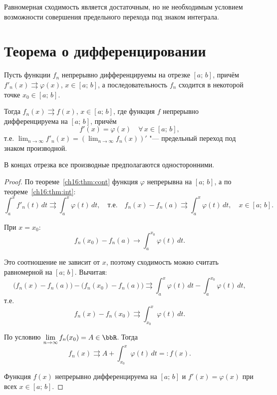 \begin{notion}
Равномерная сходимость является достаточным, но не необходимым условием возможности совершения предельного перехода под знаком интеграла.
\end{notion}

\section{Теорема о дифференцировании}

\begin{thm} \label{ch16:thm:diff}
Пусть функции $f_n$ непрерывно дифференцируемы на отрезке $[a;\, b]$, причём $f'_n(x) \rightrightarrows \varphi(x)$, $x \in [a;\, b]$, а последовательность $f_n$ сходится в некоторой точке $x_0 \in [a;\, b]$.

Тогда $f_n(x) \rightrightarrows f(x)$, $x \in [a;\, b]$, где функция $f$ непрерывно дифференцируема на $[a;\, b]$, причём
$$
f'(x) = \varphi(x) \quad \forall\, x \in [a;\, b],
$$
т.е. $\displaystyle\lim_{n \to \infty} f'_n(x) = \left(\lim_{n \to \infty} f_n(x)\right)'$ "--- предельный переход под знаком производной.

В концах отрезка все производные предполагаются односторонними.
\end{thm}

\begin{proof}
По теореме~\ref{ch16:thm:cont} функция $\varphi$ непрерывна на $[a;\, b]$, а по теореме~\ref{ch16:thm:int}:
$$
\int_a^x f'_n(t)\,dt \rightrightarrows \int_a^x \varphi(t)\,dt, \quad \text{т.е.} \quad f_n(x) - f_n(a) \rightrightarrows \int_a^x \varphi(t)\,dt, \quad x \in [a;\, b].
$$

При $x = x_0$:
$$
f_n(x_0) - f_n(a) \to \int_a^{x_0} \varphi(t)\,dt.
$$

Это соотношение не зависит от $x$, поэтому сходимость можно считать равномерной на $[a;\, b]$. Вычитая:
$$
\bigl(f_n(x) - f_n(a)\bigr) - \bigl(f_n(x_0) - f_n(a)\bigr) \rightrightarrows \int_a^x \varphi(t)\,dt - \int_a^{x_0} \varphi(t)\,dt,
$$
т.е.
$$
f_n(x) - f_n(x_0) \rightrightarrows \int_{x_0}^x \varphi(t)\,dt.
$$

По условию $\lim\limits_{n \to \infty} f_n(x_0) = A \in \bbR$. Тогда
$$
f_n(x) \rightrightarrows A + \int_{x_0}^x \varphi(t)\,dt =: f(x).
$$

Функция $f(x)$ непрерывно дифференцируема на $[a;\, b]$ и $f'(x) = \varphi(x)$ при всех $x \in [a;\, b]$.
\end{proof}

